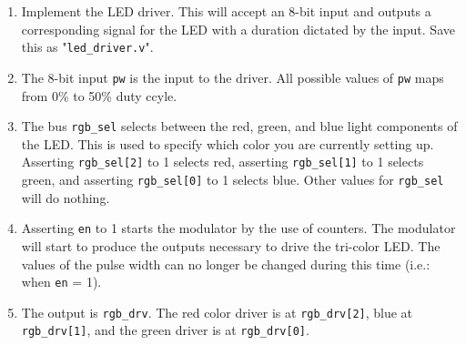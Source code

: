 \begin{enumerate}
    \item Implement the LED driver. This will accept an 8-bit input and outputs a corresponding signal for the LED with a duration dictated by the input. Save this as "\texttt{led\_driver.v}".
    
    
    
    \item The 8-bit input \texttt{pw} is the input to the driver. All possible values of \texttt{pw} maps from 0\% to 50\% duty ccyle.
    
    \item The bus \texttt{rgb\_sel} selects between the red, green, and blue light components of the LED. This is used to specify which color you are currently setting up. Asserting \texttt{rgb\_sel[2]} to 1 selects red, asserting \texttt{rgb\_sel[1]} to 1 selects green, and asserting \texttt{rgb\_sel[0]} to 1 selects blue. Other values for \texttt{rgb\_sel} will do nothing.
    
    \item Asserting \texttt{en} to 1 starts the modulator by the use of counters. The modulator will start to produce the outputs necessary to drive the tri-color LED. The values of the pulse width can no longer be changed during this time (i.e.: when \texttt{en} = 1).
    
    \item The output is \texttt{rgb\_drv}. The red color driver is at \texttt{rgb\_drv[2]}, blue at \texttt{rgb\_drv[1]}, and the green driver is at \texttt{rgb\_drv[0]}.

\end{enumerate}